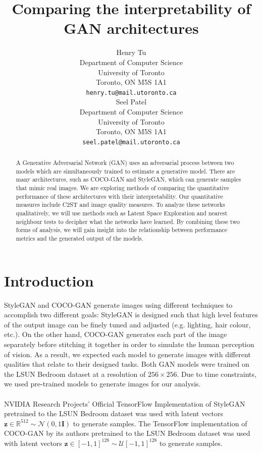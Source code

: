 \documentclass{article}
\title{Comparing the interpretability of GAN architectures}
\author{%
  Henry Tu \\
  Department of Computer Science\\
  University of Toronto\\
  Toronto, ON M5S 1A1 \\
  \texttt{henry.tu@mail.utoronto.ca} \\
   \And
     Seel Patel \\
  Department of Computer Science\\
  University of Toronto\\
  Toronto, ON M5S 1A1 \\
  \texttt{seel.patel@mail.utoronto.ca} \\
}
\begin{document}
\maketitle

\begin{abstract}
  A Generative Adversarial Network (GAN) uses an adversarial process between two models which are simultaneously trained to estimate a generative model.\cite{gan}
        There are many architectures, such as COCO-GAN\cite{cocogan} and StyleGAN\cite{stylegan}, which can generate samples that mimic real images.
        We are exploring methods of comparing the quantitative performance of these architectures with their interpretability.
        Our quantitative measures include C2ST\cite{evaluateGANs} and image quality measures\cite{evaluateGANs}.
        To analyze these networks qualitatively, we will use methods such as Latent Space Exploration\cite{sampleGAN} and nearest neighbour tests\cite{evaluateGANs} to decipher what the networks have learned.
        By combining these two forms of analysis, we will gain insight into the relationship between performance metrics and the generated output of the models.
\end{abstract}

\section{Introduction}

 StyleGAN and COCO-GAN generate images using different techniques to accomplish two different goals: StyleGAN is designed such that high level features of the output image can be finely tuned and adjusted (e.g. lighting, hair colour, etc.)\cite{stylegan}.
        On the other hand, COCO-GAN generates each part of the image separately before stitching it together in order to simulate the human perception of vision\cite{cocogan}.
        As a result, we expected each model to generate images with different qualities that relate to their designed tasks.
        Both GAN models were trained on the LSUN Bedroom dataset\cite{lsunBedroom} at a resolution of $256 \times 256$.
        Due to time constraints, we used pre-trained models to generate images for our analysis.
        \\\\
        NVIDIA Research Projects' Official TensorFlow Implementation of StyleGAN pretrained to the LSUN Bedroom dataset\cite{styleGANCode} was used with latent vectors $\mathbf{z} \in \mathbb{R}^{512} \sim \mathcal{N}(0, 1\mathbf{I})$ to generate samples.
        The TensorFlow implementation of COCO-GAN by its authors pretrained to the LSUN Bedroom dataset\cite{cocogan} was used with
        latent vectors $\mathbf{z} \in [-1, 1]^{128} \sim \mathcal{U}[-1, 1]^{128}$ to generate samples. 
\end{document}

